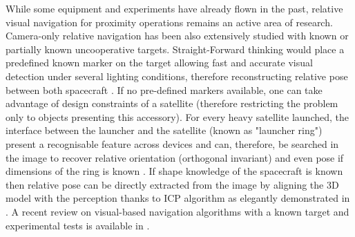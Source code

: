 While some equipment and experiments have already flown in the past, relative visual navigation for proximity operations remains an active area of research. Camera-only relative navigation has been also extensively studied with known or partially known uncooperative targets. Straight-Forward thinking would place a predefined known marker on the target allowing fast and accurate visual detection under several lighting conditions, therefore reconstructing relative pose between both spacecraft \citep{wen_robust_2017}. If no pre-defined markers available, one can take advantage of design constraints of a satellite (therefore restricting the problem only to objects presenting this accessory). For every heavy satellite launched, the interface between the launcher and the satellite (known as "launcher ring") present a recognisable feature across devices and can, therefore, be searched in the image to recover relative orientation (orthogonal invariant) and even pose if dimensions of the ring is known \citep{xu_pose_2012}. If shape knowledge of the spacecraft is known then relative pose can be directly extracted from the image by aligning the 3D model with the perception thanks to ICP algorithm as elegantly demonstrated in \citep{aghili_prediction_2012}. A recent review on visual-based navigation algorithms with a known target and experimental tests is available in \citep{pesce_experimental_2019}.

